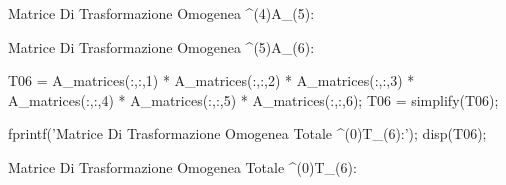 \documentclass[11pt, a4paper]{article}
\begin{document}
\begin{matlaboutput}
Matrice Di Trasformazione Omogenea ^(4)A_(5):
\end{matlaboutput}
\begin{matlaboutput}
Matrice Di Trasformazione Omogenea ^(5)A_(6):
\end{matlaboutput}
\begin{matlabcode}
T06 = A_matrices(:,:,1) * A_matrices(:,:,2) * A_matrices(:,:,3) * A_matrices(:,:,4) * A_matrices(:,:,5) * A_matrices(:,:,6);
T06 = simplify(T06);

fprintf('Matrice Di Trasformazione Omogenea Totale ^(0)T_(6):\n');
disp(T06);
\end{matlabcode}
\begin{matlaboutput}
Matrice Di Trasformazione Omogenea Totale ^(0)T_(6):
\end{matlaboutput}
\end{document}
